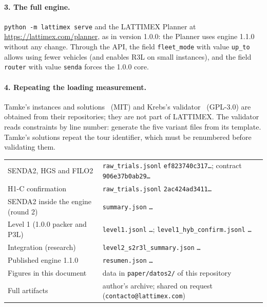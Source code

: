 \documentclass[11pt,a4paper]{article}
\newcommand{\sendados}{SENDA2}
\newcommand{\tsl}[1]{\texttt{\small #1}}
\begin{document}
\paragraph{3. The full engine.} \tsl{python -m lattimex serve} and the LATTIMEX Planner at
\url{https://lattimex.com/planner}, as in version 1.0.0: the Planner uses engine 1.1.0 without any
change. Through the API, the field \tsl{fleet\_mode} with value \tsl{up\_to} allows using fewer vehicles
(and enables R3L on small instances), and the field \tsl{router} with value \tsl{senda} forces the 1.0.0
core.

\paragraph{4. Repeating the loading measurement.} Tamke's instances and solutions~\cite{tamkerepo} (MIT)
and Krebs's validator~\cite{krebsvalidator} (GPL-3.0) are obtained from their repositories; they are not
part of LATTIMEX. The validator reads constraints by line number: generate the five variant files from
its template. Tamke's solutions repeat the tour identifier, which must be renumbered before validating
them.

\begin{reproducir}[: artifacts]
\small
\begin{tabular}{@{}p{5.2cm}p{9.3cm}@{}}
\sendados, HGS and FILO2 & \tsl{raw\_trials.jsonl} \tsl{ef823740c317\ldots}; contract \tsl{906e37b0ab29\ldots} \\
H1-C confirmation & \tsl{raw\_trials.jsonl} \tsl{2ac424ad3411\ldots} \\
\sendados{} inside the engine (round 2) & \tsl{summary.json} \tsl{\HashRondaDos\ldots} \\
Level 1 (1.0.0 packer and P3L) & \tsl{level1.jsonl} \tsl{\HashNivelUno\ldots}; \tsl{level1\_hyb\_confirm.jsonl} \tsl{\HashNivelUnoP\ldots} \\
Integration (research) & \tsl{level2\_s2r3l\_summary.json} \tsl{\HashSdosRtres\ldots} \\
Published engine 1.1.0 & \tsl{resumen.json} \tsl{\HashAocho\ldots} \\
Figures in this document & data in \tsl{paper/datos2/} of this repository \\
Full artifacts & author's archive; shared on request (\tsl{contacto@lattimex.com}) \\
\end{tabular}
\end{reproducir}



\end{document}
